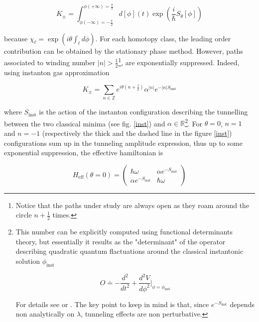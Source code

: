 \documentclass[11pt]{article}
\theoremstyle{definition}
\numberwithin{equation}{section}
\begin{document}
\begin{equation}
    K_{\pm} = \int_{\phi(-\infty) = -\frac{\pi}{2}}^{\phi(+\infty)= \frac{\pi}{2}} d[\phi](t) \exp(\frac{i}{\hbar} S_{\theta}[\phi]) 
\end{equation}

because $\chi_{\ell} = \exp(i \theta \int_{\ell} d\phi)$. For each homotopy class, the leading order contribution can be obtained by the stationary phase method. However, paths associated to winding number $|n|>\frac{1}{2}$\footnote{Notice that the paths under study are always open as they roam around the circle $n + \frac{1}{2}$ times.}, are exponentially suppressed. Indeed, using instanton gas approximation

\begin{equation}
    K_{\pm} = \sum_{n \in \mathbb{Z}} e^{i \theta  (n + \frac{1}{2}) } \alpha^{|n|} e^{-|n| S_{\text{inst}}}
\end{equation}

where $S_{\text{inst}}$ is the action of the instanton configuration describing the tunnelling between the two classical minima (see fig. \ref{inst}) and $\alpha \in \mathbb{R}$\footnote{This number can be explicitly computed using functional determinants theory, but essentially it results as the "determinant" of the operator describing quadratic quantum flactuations around the classical instantonic solution $\phi_{\text{inst}}$

\begin{equation}
    O \doteq - \frac{d^2}{dt^2} + \frac{d^2 V }{d\phi^2}\bigg|_{\phi = \phi_{\text{inst}}}
\end{equation}

For details see \cite{marino_2015} or \cite{Rattazzi}. The key point to keep in mind is that, since $e^{-S_{\text{inst}}}$ depends non analytically on $\lambda$, tunneling effects are non perturbative.}. 
For $\theta=0$,  $n=1$ and $n=-1$ (respectively the thick and the dashed line in the figure \ref{inst}) configurations sum up in the tunneling amplitude expression, thus up to some exponential suppression, the effective hamiltonian is

\begin{equation}
    H_{\text{eff}}(\theta=0)
= \begin{pmatrix}
 \hbar \omega &\alpha e^{-S_{\text{inst}}} \\
  \alpha e^{-S_{\text{inst}}}  &\hbar \omega
    \end{pmatrix}
\end{equation}
\end{document}
